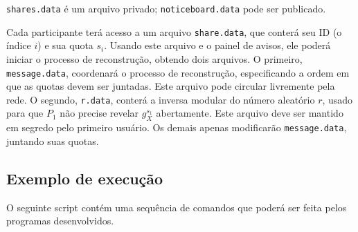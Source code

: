 \documentclass[10pt,twocolumn]{article}
\theoremstyle{definition}
\begin{document}
\verb"shares.data" é um arquivo privado;
\verb"noticeboard.data" pode ser publicado.

Cada participante terá acesso a um arquivo \verb"share.data",
que conterá seu ID (o índice $i$) e sua quota $s_i$.
Usando este arquivo e o painel de avisos,
ele poderá iniciar o processo de reconstrução,
obtendo dois arquivos.
O primeiro, \verb"message.data",
coordenará o processo de reconstrução,
especificando a ordem em que as quotas devem ser juntadas.
Este arquivo pode circular livremente pela rede.
O segundo, \verb"r.data",
conterá a inversa modular do número aleatório $r$,
usado para que $P_1$ não precise revelar $g_X^{s_1}$ abertamente.
Este arquivo deve ser mantido em segredo pelo primeiro usuário.
Os demais apenas modificarão \verb"message.data",
juntando suas quotas.

\subsection{Exemplo de execução}

O seguinte script contém uma sequência de comandos
que poderá ser feita pelos programas desenvolvidos.
\end{document}
